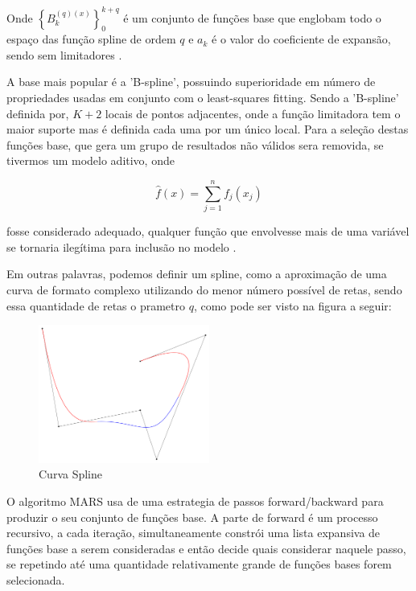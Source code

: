 \documentclass[
	12pt,				%
	openright,			%
	oneside,			%
	a4paper,			%
	english,			%
	brazil				%
	]{abntex2}
\begin{document}
Onde $\left\{B_k^{(q)(x)}\right\}_{0}^{k+q}$ é um conjunto de funções base que englobam todo o espaço das função spline de ordem $q$ e $a_k$ é o
valor do coeficiente de expansão, sendo sem limitadores \cite{intro_mars}.

A base mais popular é a 'B-spline', possuindo superioridade em número de propriedades usadas em conjunto com o least-squares 
fitting. Sendo a 'B-spline' definida por, $K+2$ locais de pontos adjacentes, onde a função limitadora tem o maior suporte
mas é definida cada uma por um único local. Para a seleção destas funções base, que gera um grupo de resultados
não válidos sera removida, se tivermos um modelo aditivo, onde

\begin{equation}
	\hat{f}(x) = \sum_{j=1}^{n}f_j(x_j)
\end{equation}

fosse considerado adequado, qualquer função que envolvesse mais de uma variável se tornaria ilegítima para inclusão no modelo \cite{intro_mars}.

Em outras palavras, podemos definir um spline, como a aproximação de uma curva de formato complexo utilizando do 
menor número possível de retas, sendo essa quantidade de retas o prametro $q$, como pode ser visto na figura a seguir:

\begin{figure}[H]
    \centering
    \caption{\label{Curva Spline}Curva Spline}
    \includegraphics[width=0.50\textwidth]{../Imgs/B-spline_curve.png}
\end{figure}

O algoritmo MARS usa de uma estrategia de passos forward/backward para produzir o seu conjunto de funções base. A parte de forward é um
processo recursivo, a cada iteração, simultaneamente constrói uma lista expansiva de funções base a serem consideradas e então decide 
quais considerar naquele passo, se repetindo até uma quantidade relativamente grande de funções bases forem selecionada. 
\end{document}

